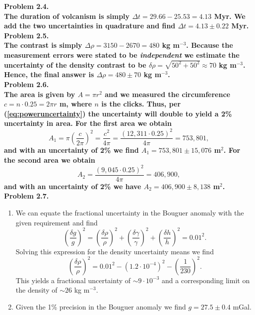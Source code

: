 \noindent
\bf{Problem 2.4.} \\


The duration of volcanism is simply $\Delta t = 29.66 - 25.53 = 4.13$ Myr.  We add the two uncertainties in quadrature
and find $\Delta t = 4.13 \pm 0.22$ Myr.
\\

\noindent
\bf{Problem 2.5.} \\

The contrast is simply $\Delta \rho = 3150 - 2670 = 480$ kg m$^{-3}$.
Because the measurement errors were stated to be \emph{independent} we estimate the uncertainty of the
density contrast to be $\delta \rho = \sqrt{50^2 + 50^2} \approx 70$ kg m$^{-3}$.  Hence, the
final answer is  $\Delta \rho = 480 \pm 70$ kg m$^{-3}$.
\\

\noindent
\bf{Problem 2.6.} \\

The area is given by $A = \pi r^2$ and we measured the circumference $c = n\cdot0.25 = 2\pi r$ m, where
$n$ is the clicks.  Thus, per (\ref{eq:poweruncertainty}) the uncertainty will double to yield a 2\% uncertainty
in area.  For the first area we obtain
$$
A_1 = \pi \left(\frac{c}{2\pi}\right)^2 = \frac{c^2}{4\pi} = \frac{(12,311\cdot0.25)^2}{4\pi} = 753,801,
$$
and with an uncertainty of 2\% we find $A_1 = 753,801 \pm 15,076$ m$^2$.  For the second area we obtain
$$
A_2 = \frac{(9,045\cdot0.25)^2}{4\pi} = 406,900,
$$
and with an uncertainty of 2\% we have $A_2 = 406,900 \pm 8,138$ m$^2$.
\\

\noindent
\bf{Problem 2.7.} \\
\begin{enumerate}[label=\alph*)]
\item We can equate the fractional uncertainty in the Bouguer anomaly with the given requirement and find
$$
\left (\frac{\delta g}{g}\right)^2 = \left (\frac{\delta \rho}{\rho}\right)^2 + \left (\frac{\delta \gamma}{\gamma}\right)^2 + \left (\frac{\delta h}{h}\right)^2 = 0.01^2.
$$
Solving this expression for the density uncertainty means we find
$$
\left (\frac{\delta \rho}{\rho}\right)^2 = 0.01^2 - \left (1.2\cdot10^{-4}\right)^2 - \left (\frac{1}{230}\right)^2.
$$
This yields a fractional uncertainty of $\sim 9\cdot 10^{-3}$ and a corresponding limit on the density of $\sim 26$ kg m$^{-3}$.

\item Given the 1\% precision in the Bouguer anomaly we find $g = 27.5 \pm 0.4$ mGal.
\end{enumerate}


